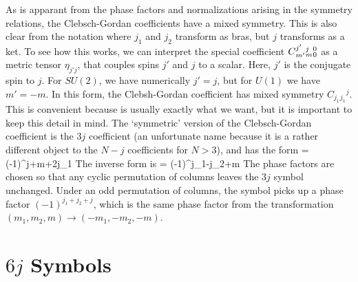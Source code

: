 \documentclass{article}[10pt]
\begin{document}
As is apparant from the phase factors and normalizations arising in
the symmetry relations, the Clebsch-Gordan coefficients have a mixed
symmetry. This is also clear from the notation 
where $j_1$ and $j_2$ transform as bras, but $j$ transforms as a ket.
To see how this works, we can interpret the special
coefficient $\qcg{j'}{j}{0}{m'}{m}{0}$ as a metric tensor $\eta_{j'j}$, that
couples spins $j'$ and $j$ to a scalar. Here, $j'$ is the conjugate
spin to $j$. For $SU(2)$, we have numerically $j' = j$, but for
$U(1)$ we have $m' = -m$. In this form, the Clebsh-Gordan coefficient
has mixed symmetry $C_{j_1} {}_{j_1} {}^{j}$. This is convenient 
because  is usually exactly what we want,
but it is important to keep this detail in mind. The `symmetric'
version of the Clebsch-Gordan coefficient is the $3j$ coefficient
(an unfortunate name because it is a rather different object to the
$N-j$ coefficients for $N > 3$), and has the form
\beq
{} = (-1)^{j+m+2j_1} 
\eeq
The inverse form is
\beq
{} = (-1)^{j_1-j_2+m} 
\eeq
The phase factors are chosen so that any cyclic permutation of columns leaves
the $3j$ symbol unchanged. Under an odd permutation of columns, the symbol
picks up a phase factor $(-1)^{j_1+j_2+j}$, which is the same phase factor
from the transformation $(m_1,m_2,m) \rightarrow (-m_1,-m_2,-m)$.

\section{$6j$ Symbols}
\end{document}
